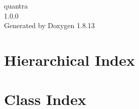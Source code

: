 \documentclass[twoside]{book}
\newcommand{\+}{\discretionary{\mbox{\scriptsize$\hookleftarrow$}}{}{}}
\newcommand{\clearemptydoublepage}{%
  \newpage{\pagestyle{empty}\cleardoublepage}%
}
\begin{document}
\hypersetup{pageanchor=false,
             bookmarksnumbered=true,
             pdfencoding=unicode
            }
\begin{titlepage}
\vspace*{7cm}
\begin{center}%
{\Large quantra \\[1ex]\large 1.\+0.\+0 }\\
\vspace*{1cm}
{\large Generated by Doxygen 1.8.13}\\
\end{center}
\end{titlepage}
\clearemptydoublepage
{}
\tableofcontents
\clearemptydoublepage
{}
\hypersetup{pageanchor=true}

\chapter{Hierarchical Index}

\chapter{Class Index}

\end{document}
